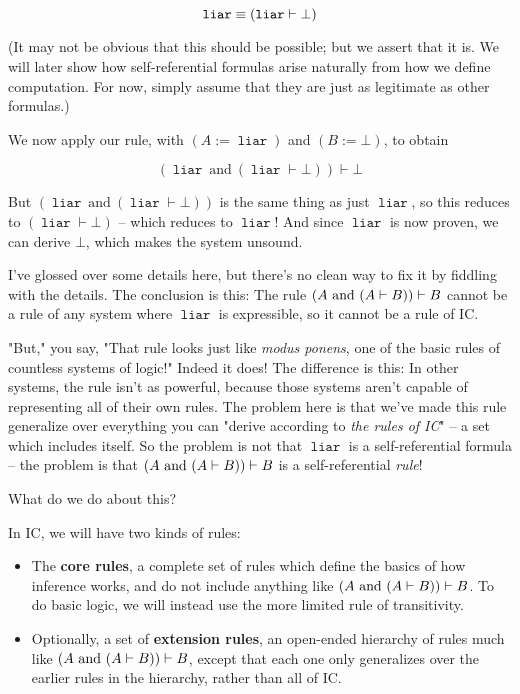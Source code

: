 \documentclass{article}
\begin{document}
  \newcommand{\name}[1]{\operatorname{\texttt{#1}}}
  \begin{equation*}
    \name{liar} \equiv (\name{liar} \vdash \bot)\\
  \end{equation*}
  
  (It may not be obvious that this should be possible; but we assert that it is.
  We will later show how self-referential formulas arise naturally from how we define computation.
  For now, simply assume that they are just as legitimate as other formulas.)
  
  We now apply our rule, with $(A := \name{liar})$ and $(B := \bot)$, to obtain 
  
  \begin{equation*}
    (\name{liar}\ \mathrm{and}\ (\name{liar} \vdash \bot)) \vdash \bot
  \end{equation*}
  
  But $(\name{liar}\ \mathrm{and}\ (\name{liar} \vdash \bot))$ is the same thing as just $\name{liar}$, so this reduces to $(\name{liar} \vdash \bot)$ – which reduces to $\name{liar}$! And since $\name{liar}$ is now proven, we can derive $\bot$, which makes the system unsound.
  
  I've glossed over some details here, but there's no clean way to fix it by fiddling with the details. The conclusion is this: The rule $(A\ \mathrm{and}\ (A \vdash B)) \vdash B$ cannot be a rule of any system where $\name{liar}$ is expressible, so it cannot be a rule of IC.
  
  "But," you say, "That rule looks just like \emph{modus ponens}, one of the basic rules of countless systems of logic!" Indeed it does! The difference is this: In other systems, the rule isn't as powerful, because those systems aren't capable of representing all of their own rules. The problem here is that we've made this rule generalize over everything you can "derive according to \emph{the rules of IC}" – a set which includes itself. So the problem is not that $\name{liar}$ is a self-referential formula – the problem is that $(A\ \mathrm{and}\ (A \vdash B)) \vdash B$ is a self-referential \emph{rule}!
  
  What do we do about this?
  
  In IC, we will have two kinds of rules:
  \begin{itemize}
    \item The \textbf{core rules}, a complete set of rules which define the basics of how inference works, and do not include anything like $(A\ \mathrm{and}\ (A \vdash B)) \vdash B$. To do basic logic, we will instead use the more limited rule of transitivity.
    \item Optionally, a set of \textbf{extension rules}, an open-ended hierarchy of rules much like $(A\ \mathrm{and}\ (A \vdash B)) \vdash B$, except that each one only generalizes over the earlier rules in the hierarchy, rather than all of IC.
  \end{itemize}
  
\end{document}
